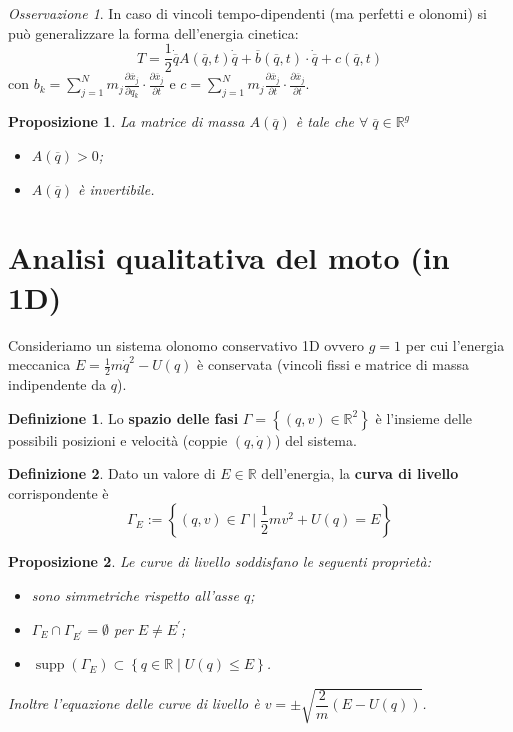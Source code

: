 \documentclass{book}
\theoremstyle{plain}
\theoremstyle{plain}
\theoremstyle{plain}
\theoremstyle{plain}
\theoremstyle{plain}
\newtheorem{prop}{Proposizione}[chapter]
\theoremstyle{definition}
\newtheorem{defi}{Definizione}[chapter]
\theoremstyle{remark}
\newtheorem*{oss}{Osservazione}
\theoremstyle{definition}
\begin{document}
\begin{oss}
    In caso di vincoli tempo-dipendenti (ma perfetti e olonomi) si può generalizzare la forma dell'energia cinetica:
    \begin{displaymath}
    \boxed{
        T=\frac{1}{2}\dot{\overline{q}}A(\overline{q},t)\dot{\overline{q}} +\overline{b}(\overline{q},t)\cdot\dot{\overline{q}} +c(\overline{q},t)
        }
    \end{displaymath}
    con $b_k=\sum_{j=1}^N m_j\frac{\partial\overline{x}_j}{\partial q_k} \cdot\frac{\partial\overline{x}_j}{\partial t}$ e $c=\sum_{j=1}^N m_j\frac{\partial\overline{x}_j}{\partial t} \cdot\frac{\partial\overline{x}_j}{\partial t}$.
\end{oss}

\begin{prop}
    La matrice di massa $A(\overline{q})$ è tale che $\forall \; \overline{q}\in\mathbb{R}^g$
    \begin{itemize}
        \item $A(\overline{q})>0$;
        \item  $A(\overline{q})$ è invertibile.
    \end{itemize}
\end{prop}

\section{Analisi qualitativa del moto (in 1D)}

Consideriamo un sistema olonomo conservativo 1D ovvero $g=1$ per cui l'energia meccanica $E=\frac{1}{2}m\dot{q}^2-U(q)$ è conservata (vincoli fissi e matrice di massa indipendente da $q$).

\begin{defi}
    Lo \textbf{spazio delle fasi} $\Gamma = \left\{(q, v) \in \mathbb{R}^2\right\}$ è l'insieme delle possibili posizioni e velocità (coppie $(q,\dot{q})$) del sistema.
\end{defi}

\begin{defi}
    Dato un valore di $E\in\mathbb{R}$ dell'energia, la \textbf{curva di livello} corrispondente è
    \begin{displaymath}
        \boxed{
        \Gamma_E:=\left\{(q,v)\in\Gamma \; | \; \frac{1}{2}mv^2+U(q)=E\right\}
        }
    \end{displaymath}
\end{defi}

\begin{prop}
    Le curve di livello soddisfano le seguenti proprietà:
    \begin{itemize}
        \item sono simmetriche rispetto all'asse $q$;
        \item $\Gamma_E\cap\Gamma_{E^{\prime}} = \emptyset$ per $E\neq E^{\prime}$;
        \item $\operatorname{supp}(\Gamma_E)\subset \left\{q\in\mathbb{R} \; |\; U(q) \leq E\right\}$.
    \end{itemize}
    Inoltre l'equazione delle curve di livello è $v=\pm\sqrt{\dfrac{2}{m}\left(E-U(q)\right)}$. 
\end{prop}
\end{document}
